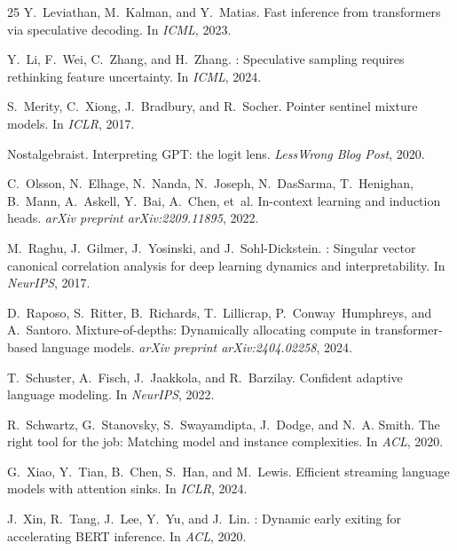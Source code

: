\documentclass{article}
\begin{document}
\begin{thebibliography}{25}
Y.~Leviathan, M.~Kalman, and Y.~Matias.
\newblock Fast inference from transformers via speculative decoding.
\newblock In \emph{ICML}, 2023.

Y.~Li, F.~Wei, C.~Zhang, and H.~Zhang.
: Speculative sampling requires rethinking feature uncertainty.
\newblock In \emph{ICML}, 2024.

S.~Merity, C.~Xiong, J.~Bradbury, and R.~Socher.
\newblock Pointer sentinel mixture models.
\newblock In \emph{ICLR}, 2017.

Nostalgebraist.
\newblock Interpreting {GPT}: the logit lens.
\newblock \emph{LessWrong Blog Post}, 2020.

C.~Olsson, N.~Elhage, N.~Nanda, N.~Joseph, N.~DasSarma, T.~Henighan, B.~Mann, A.~Askell, Y.~Bai, A.~Chen, et~al.
\newblock In-context learning and induction heads.
\newblock \emph{arXiv preprint arXiv:2209.11895}, 2022.

M.~Raghu, J.~Gilmer, J.~Yosinski, and J.~Sohl-Dickstein.
: Singular vector canonical correlation analysis for deep learning dynamics and interpretability.
\newblock In \emph{NeurIPS}, 2017.

D.~Raposo, S.~Ritter, B.~Richards, T.~Lillicrap, P.~Conway~Humphreys, and A.~Santoro.
\newblock Mixture-of-depths: Dynamically allocating compute in transformer-based language models.
\newblock \emph{arXiv preprint arXiv:2404.02258}, 2024.

T.~Schuster, A.~Fisch, J.~Jaakkola, and R.~Barzilay.
\newblock Confident adaptive language modeling.
\newblock In \emph{NeurIPS}, 2022.

R.~Schwartz, G.~Stanovsky, S.~Swayamdipta, J.~Dodge, and N.~A. Smith.
\newblock The right tool for the job: Matching model and instance complexities.
\newblock In \emph{ACL}, 2020.

G.~Xiao, Y.~Tian, B.~Chen, S.~Han, and M.~Lewis.
\newblock Efficient streaming language models with attention sinks.
\newblock In \emph{ICLR}, 2024.

J.~Xin, R.~Tang, J.~Lee, Y.~Yu, and J.~Lin.
: Dynamic early exiting for accelerating {BERT} inference.
\newblock In \emph{ACL}, 2020.


\end{thebibliography}
\end{document}
